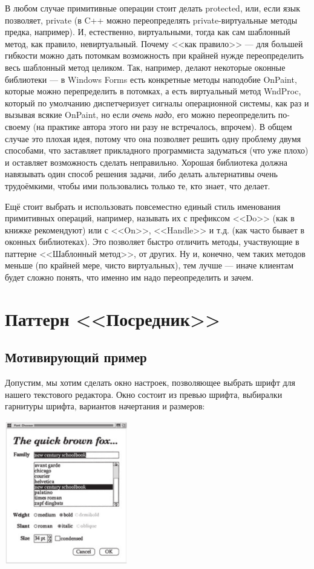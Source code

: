 \documentclass{../../text-style}
\begin{document}
В любом случае примитивные операции стоит делать protected, или, если язык позволяет, private (в C++ можно переопределять private-виртуальные методы предка, например). И, естественно, виртуальными, тогда как сам шаблонный метод, как правило, невиртуальный. Почему <<как правило>> --- для большей гибкости можно дать потомкам возможность при крайней нужде переопределить весь шаблонный метод целиком. Так, например, делают некоторые оконные библиотеки --- в Windows Forms есть конкретные методы наподобие OnPaint, которые можно перепределить в потомках, а есть виртуальный метод WndProc, который по умолчанию диспетчеризует сигналы операционной системы, как раз и вызывая всякие OnPaint, но если \emph{очень надо}, его можно переопределить по-своему (на практике автора этого ни разу не встречалось, впрочем). В общем случае это плохая идея, потому что она позволяет решить одну проблему двумя способами, что заставляет прикладного программиста задуматься (что уже плохо) и оставляет возможность сделать неправильно. Хорошая библиотека должна навязывать один способ решения задачи, либо делать альтернативы очень трудоёмкими, чтобы ими пользовались только те, кто знает, что делает.

Ещё стоит выбрать и использовать повсеместно единый стиль именования примитивных операций, например, называть их с префиксом <<Do>> (как в книжке рекомендуют) или с <<On>>, <<Handle>> и т.д. (как часто бывает в оконных библиотеках). Это позволяет быстро отличить методы, участвующие в паттерне <<Шаблонный метод>>, от других. Ну и, конечно, чем таких методов меньше (по крайней мере, чисто виртуальных), тем лучше --- иначе клиентам будет сложно понять, что именно им надо переопределить и зачем.

\section{Паттерн <<Посредник>>}

\subsection{Мотивирующий пример}

Допустим, мы хотим сделать окно настроек, позволяющее выбрать шрифт для нашего текстового редактора. Окно состоит из превью шрифта, выбиралки гарнитуры шрифта, вариантов начертания и размеров:

\begin{center}
    \includegraphics[width=0.4\textwidth]{mediatorMotivation.png}
\end{center}
\end{document}

